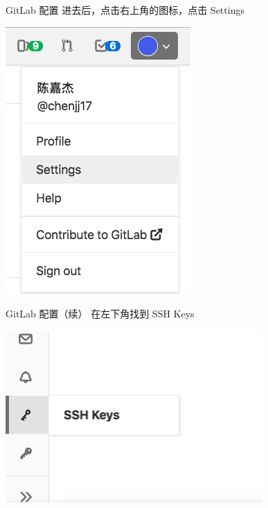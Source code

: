 \documentclass{beamer}
\begin{document}
\begin{frame}{GitLab 配置}
    进去后，点击右上角的图标，点击 Settings

    \includegraphics[width=0.5\linewidth]{2018-10-25-11-37-23.png}
\end{frame}

\begin{frame}{GitLab 配置（续）}
    在左下角找到 SSH Keys

    \includegraphics[width=\linewidth]{2018-10-25-11-38-45.png}
\end{frame}
\end{document}

